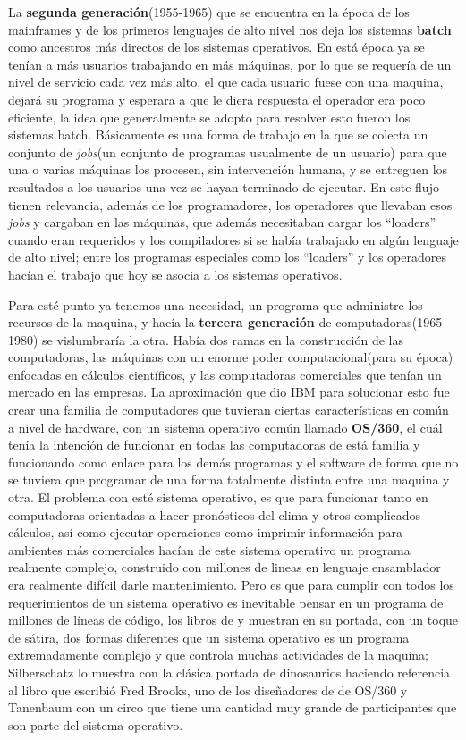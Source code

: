 \documentclass[letterpaper,12pt,oneside]{book}
\begin{document}
		La \textbf{segunda generación}(1955-1965) que se encuentra en la época de los mainframes y de los primeros lenguajes de alto nivel nos deja
		los sistemas \textbf{batch} como ancestros más directos de los sistemas operativos. En está época ya se tenían a más usuarios trabajando en más máquinas, por
		lo que se requería de un nivel de servicio cada vez más alto, el que cada usuario fuese con una maquina, dejará su programa y esperara a que le diera
		respuesta el operador era poco eficiente, la idea que generalmente se adopto para resolver esto fueron los sistemas batch. Básicamente es una forma de trabajo
		en la que se colecta un conjunto de \textit{jobs}(un conjunto de programas usualmente de un usuario) para que una o varias máquinas los procesen, sin intervención 
		humana, y se entreguen los resultados a los usuarios una vez se hayan terminado de ejecutar. En este flujo tienen relevancia, además de los programadores,
		los operadores que llevaban esos \textit{jobs} y cargaban en las máquinas, que además necesitaban cargar los ``loaders'' cuando eran requeridos y los
		compiladores si se había trabajado en algún lenguaje de alto nivel; entre los programas especiales como los ``loaders'' y los operadores hacían
		el trabajo que hoy se asocia a los sistemas operativos.
		
		Para esté punto ya tenemos una necesidad, un programa que administre los recursos de la maquina,  y hacía la \textbf{tercera generación} de computadoras(1965-1980)
		se vislumbraría la otra. Había dos ramas en la construcción de las computadoras, las máquinas con un enorme poder computacional(para su época) enfocadas
		en cálculos científicos, y las computadoras comerciales que tenían un mercado en las empresas. La aproximación que dio IBM para solucionar esto
		fue crear una familia de computadores que tuvieran ciertas características en común a nivel de hardware, con un sistema operativo común llamado
		\textbf{OS/360}, el cuál tenía la intención de funcionar en todas las computadoras de está familia y funcionando como enlace para los demás programas y el software
		de forma que no se tuviera que programar de una forma totalmente distinta entre una maquina y otra. El problema con esté sistema operativo, es que para funcionar
		tanto en computadoras orientadas a hacer pronósticos del clima y otros complicados cálculos, así como ejecutar operaciones como imprimir información
		para ambientes más comerciales hacían de este sistema operativo un programa realmente complejo, construido con millones de lineas en lenguaje ensamblador
		era realmente difícil darle mantenimiento. Pero es que para cumplir con todos los requerimientos de un sistema operativo es inevitable pensar en un programa
		de millones de líneas de código, los libros de \cite{tanenbaum_modern_2002} y \cite{silberschatz_operating_2009} muestran en su portada, con un toque de sátira,
		dos formas diferentes que un sistema operativo es un programa extremadamente complejo y que controla muchas actividades de la maquina; Silberschatz lo muestra
		con la clásica portada de dinosaurios haciendo referencia al libro que escribió Fred Brooks, uno de los diseñadores de de OS/360 y Tanenbaum con un circo que
		tiene una cantidad muy grande de participantes que son parte del sistema operativo.
		
\end{document}
